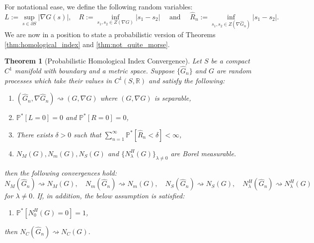 \documentclass[11pt]{article}
\newcommand{\subscript}[2]{$#1 _ #2$}
\newcommand{\1}{\mathbf{1}}
\newtheorem{thm}{Theorem}%
\theoremstyle{definition}
\theoremstyle{remark}
\begin{document}
For notational ease, we define the following random variables:
\begin{equation}\nonumber
    L := \sup_{s \in \partial S} |\nabla G(s)|, \quad R := \inf_{s_1,s_2\in Z(\nabla G)} |s_1-s_2| \quad \text{ and } \quad \hat{R}_n := \inf_{s_1,s_2\in Z(\nabla \hat{G}_n)} |s_1-s_2|.
\end{equation}
We are now in a position to state a probabilistic version of Theorems \ref{thm:homological_index} and \ref{thm:not_quite_morse}.
\begin{mdframed}
\begin{thm}[Probabilistic Homological Index Convergence]\label{thm:prob_hom}
     Let $S$ be a compact $C^1$ manifold with boundary and a metric space. Suppose $\{\hat{G}_n\}$ and $G$ are random processes which take their values in $C^1(S,\mathbb{R})$ and satisfy the following:
    \begin{enumerate}[label=(\subscript{H}{{\arabic*}})]
        \item $(\hat{G}_n, \nabla \hat{G}_n)\rightsquigarrow (G, \nabla G)$ where $(G, \nabla G)$ is separable,
        \item $\mathbb{P}^*[L=0]=0$ and $\mathbb{P}^*[R=0]=0$,
        \item There exists $\delta >0$ such that $\sum_{n=1}^\infty \mathbb{P}^{*}[\hat{R}_n < \delta] < \infty$,
        \item $N_M(G), N_m(G), N_S(G)$ and $\{N_\lambda^H(G)\}_{\lambda \neq 0}$ are Borel measurable.
    \end{enumerate}
    then the following convergences hold:
    \begin{equation}\label{eq:conv_res}
        N_M(\hat{G}_n)\rightsquigarrow N_M(G), \quad N_m(\hat{G}_n)\rightsquigarrow N_m(G), \quad N_S(\hat{G}_n)\rightsquigarrow N_S(G), \quad N^H_\lambda(\hat{G}_n)\rightsquigarrow N^H_\lambda(G)
    \end{equation}
    for $\lambda\neq 0$. If, in addition, the below assumption is satisfied:
    \begin{enumerate}[label=(\subscript{H}{{\arabic*}})]
        \item[($H_5$)] $\mathbb{P}^*[N^H_0(G) = 0]=1$,
    \end{enumerate}
    then $N_C(\hat{G}_n)\rightsquigarrow N_C(G)$.
    \vspace{0.2cm}
\end{thm}
\end{mdframed}
\end{document}
